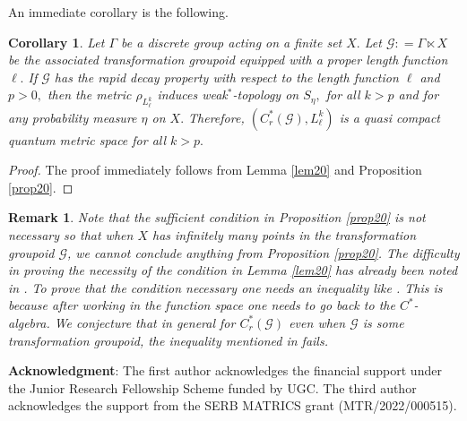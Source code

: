 \documentclass[a4paper,11pt,reqno]{amsart}
\theoremstyle{plain}
\newtheorem{cor}[thm]{Corollary}
\newtheorem{lem}[thm]{Lemma}
\newtheorem{rem}[thm]{Remark}
\theoremstyle{named}
\numberwithin{equation}{section}
\begin{document}
			An immediate corollary is the following.
			
			\begin{cor}\label{cor20}
				Let $\Gamma$ be a discrete group acting on a finite set $X.$ Let $\mathcal G : = \Gamma \ltimes X$ be the associated transformation groupoid equipped with a proper length function $\ell.$ If $\mathcal G$ has the rapid decay property with respect to the length function $\ell$ and $p > 0,$ then the metric $\rho_{L_{\ell}^k}$ induces weak$^{\ast}$-topology on $S_{\eta},$ for all $k > p$ and for any probability measure $\eta$ on $X.$ Therefore, $\left (C_r^{\ast} (\mathcal G), L^k_{\ell} \right )$ is a quasi compact quantum metric space for all $k > p.$    
			\end{cor}
			
			\begin{proof}
				The proof immediately follows from Lemma \ref{lem20} and Proposition \ref{prop20}.
			\end{proof}
			\begin{rem}
				Note that the sufficient condition in Proposition \ref{prop20} is not necessary so that when $X$ has infinitely many points in the transformation groupoid $\mathcal G$, we cannot conclude anything from  Proposition \ref{prop20}. The difficulty in proving the necessity of the condition in Lemma \ref{lem20} has already been noted in \cite[Theorem 1.8]{Rieffel-1998-Metrics-on-state-from-action-of-cmpt-gp}. To prove that the condition necessary one needs an inequality like \cite[Condition 1.5]{Rieffel-1998-Metrics-on-state-from-action-of-cmpt-gp}. This is because after working in the function space one needs to go back to the $C^{\ast}$-algebra. We conjecture that in general for $C^{\ast}_{r}(\mathcal G)$ even when $\mathcal G$ is some transformation groupoid, the inequality mentioned in \cite[Condition 1.5]{Rieffel-1998-Metrics-on-state-from-action-of-cmpt-gp} fails.
			\end{rem}
			
			{\bf Acknowledgment}: The first author acknowledges the financial support under the Junior Research Fellowship Scheme funded by UGC. The third author acknowledges the support from the SERB MATRICS grant (MTR/2022/000515).
			
			
			
\end{document}
